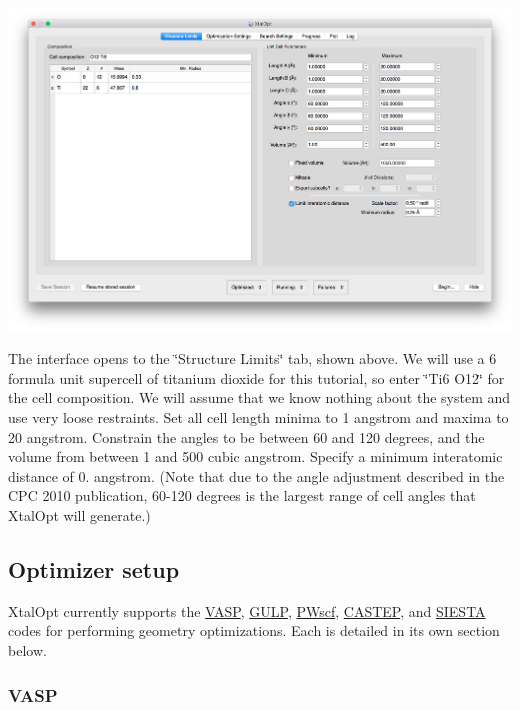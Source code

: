 \begin{DoxyImageNoCaption}
  \mbox{\includegraphics[width=\textwidth]{struct-lim.png}}
\end{DoxyImageNoCaption}


The interface opens to the \char`\"{}\+Structure Limits\char`\"{} tab, shown above. We will use a 6 formula unit supercell of titanium dioxide for this tutorial, so enter \char`\"{}\+Ti6 O12\char`\"{} for the cell composition. We will assume that we know nothing about the system and use very loose restraints. Set all cell length minima to 1 angstrom and maxima to 20 angstrom. Constrain the angles to be between 60 and 120 degrees, and the volume from between 1 and 500 cubic angstrom. Specify a minimum interatomic distance of 0. angstrom. (Note that due to the angle adjustment described in the C\+P\+C 2010 publication, 60-\/120 degrees is the largest range of cell angles that Xtal\+Opt will generate.)\hypertarget{tut-xo_opt}{}\subsection{Optimizer setup}\label{tut-xo_opt}
Xtal\+Opt currently supports the \hyperlink{tut-xo_vasp-opt}{V\+A\+S\+P}, \hyperlink{tut-xo_gulp-opt}{G\+U\+L\+P}, \hyperlink{tut-xo_pwscf-opt}{P\+Wscf}, \hyperlink{tut-xo_castep-opt}{C\+A\+S\+T\+E\+P}, and \hyperlink{tut-xo_siesta-opt}{S\+I\+E\+S\+T\+A} codes for performing geometry optimizations. Each is detailed in its own section below.\hypertarget{tut-xo_vasp-opt}{}\subsubsection{V\+A\+S\+P}\label{tut-xo_vasp-opt}
 
